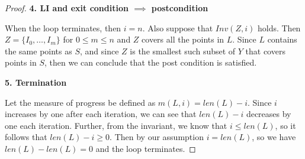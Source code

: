 \begin{proof}
    \textbf{4. LI and exit condition $\implies$ postcondition}
    
    When the loop terminates, then $i = n$. Also suppose that 
    $Inv(Z, i)$ holds. Then $Z = \{ I_0, \dots, I_m \}$
    for $0 \leqslant m \leqslant n$ and $Z$ covers all the points 
    in $L$. Since $L$ contains the same points as $S$, and since 
    $Z$ is the smallest such subset of $Y$ that covers points in 
    $S$, then we can conclude that the post condition is satisfied.
    
    \textbf{5. Termination}
    
    Let the measure of progress be defined as $m(L, i) = len(L) - i$.
    Since $i$ increases by one after each iteration, 
    we can see that $len(L) - i$
    decreases by one each iteration. Further, from the invariant,
    we know that $i \leqslant len(L)$, so it follows that
    $len(L) - i \geqslant 0$. Then by our assumption $i = len(L)$, so 
    we have $len(L) - len(L) = 0$ and the loop terminates.
    
    
\end{proof}



\newpage